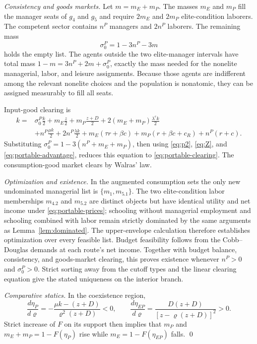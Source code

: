 \documentclass[12pt,letterpaper]{article}
\theoremstyle{definition}
\begin{document}
\emph{Consistency and goods markets.}
Let $m=m_E+m_P$.
The masses $m_E$ and $m_P$ fill the manager seats of $g_4$ and $g_5$ and require
$2m_E$ and $2m_P$ elite-condition laborers.
The competent sector contains $n^P$ managers and $2n^P$ laborers.
The remaining mass
\[
\sigma_0^P=1-3n^P-3m
\]
holds the empty list.
The agents outside the two elite-manager intervals have total mass
$1-m=3n^P+2m+\sigma_0^P$, exactly the mass needed for the nonelite managerial,
labor, and leisure assignments.
Because those agents are indifferent among the relevant nonelite choices and the
population is nonatomic, they can be assigned measurably to fill all seats.

Input-good clearing is
\[
\begin{aligned}
k
={}&
\sigma_0^P\frac{k}{2}
+m_E\frac{z}{2}
+m_P\frac{z+D}{2}
+2(m_E+m_P)\frac{\lambda^e k}{2}\\
&+n^P\frac{\mu k}{2}
+2n^P\frac{\lambda k}{2}
+m_E(\tau r+\beta c)
+m_P(r+\beta c+c_R)
+n^P(r+c).
\end{aligned}
\]
Substituting $\sigma_0^P=1-3(n^P+m_E+m_P)$, then using
\eqref{eq:p2}, \eqref{eq:Z}, and \eqref{eq:portable-advantage}, reduces this equation
to \eqref{eq:portable-clearing}.
The consumption-good market clears by Walras' law.

\emph{Optimization and existence.}
In the augmented consumption sets the only new undominated managerial list is
$\{m_1,m_{5.1}\}$.
The two elite-condition labor memberships $m_{4.2}$ and $m_{5.2}$ are distinct objects
but have identical utility and net income under \eqref{eq:portable-prices}; schooling
without managerial employment and schooling combined with labor remain strictly
dominated by the same arguments as Lemma~\ref{lem:dominated}.
The upper-envelope calculation therefore establishes optimization over every feasible
list.
Budget feasibility follows from the Cobb--Douglas demands at each route's net income.
Together with budget balance, consistency, and goods-market clearing, this proves
existence whenever $n^P>0$ and $\sigma_0^P>0$.
Strict sorting away from the cutoff types and the linear clearing equation give the
stated uniqueness on the interior branch.

\emph{Comparative statics.}
In the coexistence region,
\[
\frac{d\eta_P}{d\varrho}
=
-\frac{\mu k-(z+D)}{\varrho^2(z+D)}
<0,
\qquad
\frac{d\eta_{EP}}{d\varrho}
=
\frac{D(z+D)}{[z-\varrho(z+D)]^2}
>0.
\]
Strict increase of $F$ on its support then implies that $m_P$ and
$m_E+m_P=1-F(\eta_P)$ rise while $m_E=1-F(\eta_{EP})$ falls.
\qed
\end{document}
